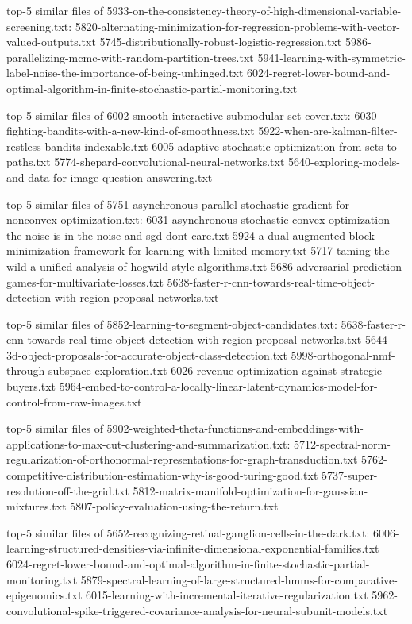 \documentclass[11pt]{article}
\begin{document}
top-5 similar files of
5933-on-the-consistency-theory-of-high-dimensional-variable-screening.txt:
5820-alternating-minimization-for-regression-problems-with-vector-valued-outputs.txt
5745-distributionally-robust-logistic-regression.txt
5986-parallelizing-mcmc-with-random-partition-trees.txt
5941-learning-with-symmetric-label-noise-the-importance-of-being-unhinged.txt
6024-regret-lower-bound-and-optimal-algorithm-in-finite-stochastic-partial-monitoring.txt

top-5 similar files of 6002-smooth-interactive-submodular-set-cover.txt:
6030-fighting-bandits-with-a-new-kind-of-smoothness.txt
5922-when-are-kalman-filter-restless-bandits-indexable.txt
6005-adaptive-stochastic-optimization-from-sets-to-paths.txt
5774-shepard-convolutional-neural-networks.txt
5640-exploring-models-and-data-for-image-question-answering.txt

top-5 similar files of
5751-asynchronous-parallel-stochastic-gradient-for-nonconvex-optimization.txt:
6031-asynchronous-stochastic-convex-optimization-the-noise-is-in-the-noise-and-sgd-dont-care.txt
5924-a-dual-augmented-block-minimization-framework-for-learning-with-limited-memory.txt
5717-taming-the-wild-a-unified-analysis-of-hogwild-style-algorithms.txt
5686-adversarial-prediction-games-for-multivariate-losses.txt
5638-faster-r-cnn-towards-real-time-object-detection-with-region-proposal-networks.txt

top-5 similar files of 5852-learning-to-segment-object-candidates.txt:
5638-faster-r-cnn-towards-real-time-object-detection-with-region-proposal-networks.txt
5644-3d-object-proposals-for-accurate-object-class-detection.txt
5998-orthogonal-nmf-through-subspace-exploration.txt
6026-revenue-optimization-against-strategic-buyers.txt
5964-embed-to-control-a-locally-linear-latent-dynamics-model-for-control-from-raw-images.txt

top-5 similar files of
5902-weighted-theta-functions-and-embeddings-with-applications-to-max-cut-clustering-and-summarization.txt:
5712-spectral-norm-regularization-of-orthonormal-representations-for-graph-transduction.txt
5762-competitive-distribution-estimation-why-is-good-turing-good.txt
5737-super-resolution-off-the-grid.txt
5812-matrix-manifold-optimization-for-gaussian-mixtures.txt
5807-policy-evaluation-using-the-return.txt

top-5 similar files of
5652-recognizing-retinal-ganglion-cells-in-the-dark.txt:
6006-learning-structured-densities-via-infinite-dimensional-exponential-families.txt
6024-regret-lower-bound-and-optimal-algorithm-in-finite-stochastic-partial-monitoring.txt
5879-spectral-learning-of-large-structured-hmms-for-comparative-epigenomics.txt
6015-learning-with-incremental-iterative-regularization.txt
5962-convolutional-spike-triggered-covariance-analysis-for-neural-subunit-models.txt
\end{document}
